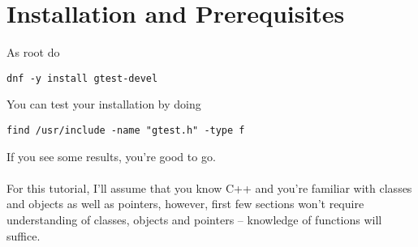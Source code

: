 \section{Installation and Prerequisites}
As root do
\begin{Verbatim}[frame=single]
dnf -y install gtest-devel
\end{Verbatim}

You can test your installation by doing
\begin{Verbatim}[frame=single]
find /usr/include -name "gtest.h" -type f
\end{Verbatim}
If you see some results, you're good to go. \\ \\
For this tutorial, I'll assume that you know C++ and you're familiar with
classes and objects as well as pointers, however, first few sections won't
require understanding of classes, objects and pointers -- knowledge of functions
will suffice.
\newpage
